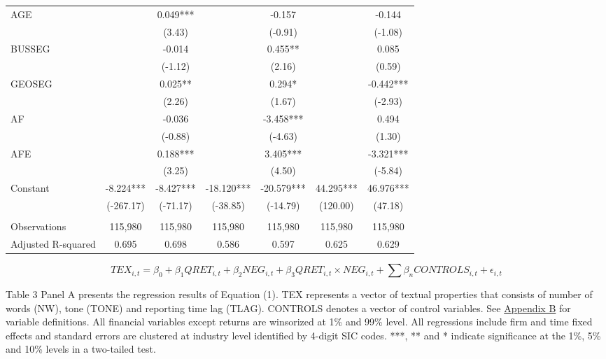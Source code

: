 \begin{table}[H]
\begin{center}
\begin{tabular}{lcccccc}
			AGE &   & 0.049*** &   & -0.157 &   & -0.144 \\
			&   & (3.43) &   & (-0.91) &   & (-1.08) \\
			BUSSEG &   & -0.014 &   & 0.455** &   & 0.085 \\
			&   & (-1.12) &   & (2.16) &   & (0.59) \\
			GEOSEG &   & 0.025** &   & 0.294* &   & -0.442*** \\
			&  & (2.26) &   & (1.67) &   & (-2.93) \\
			AF &   & -0.036 &   & -3.458*** &   & 0.494 \\
			&   & (-0.88) &   & (-4.63) &   & (1.30) \\
			AFE &   & 0.188*** &   & 3.405*** &   & -3.321*** \\
			&   & (3.25) &   & (4.50) &   & (-5.84) \\
			Constant & -8.224*** & -8.427*** & -18.120*** & -20.579*** & 44.295*** & 46.976*** \\
			& (-267.17) & (-71.17) & (-38.85) & (-14.79) & (120.00) & (47.18) \\
			&   &   &   &   &   &  \\
			Observations & 115,980 & 115,980 & 115,980 & 115,980 & 115,980 & 115,980 \\
			Adjusted R-squared & 0.695 & 0.698 & 0.586 & 0.597 & 0.625 & 0.629 \\
			\bottomrule
			\bottomrule
		\end{tabular}%
	\end{center}
		\begin{footnotesize}
			\setcounter{equation}{0}
			\begin{equation}
				TEX_{i,t}=\beta_0+\beta_1QRET_{i,t}+\beta_2NEG_{i,t}+\beta_3QRET_{i,t}\times NEG_{i,t}+\sum\beta_nCONTROLS_{i,t}+\epsilon_{i,t}
			\end{equation}
			
			\noindent Table 3 Panel A presents the regression results of Equation (1). TEX represents a vector of textual properties that consists of number of words (NW), tone (TONE) and reporting time lag (TLAG). CONTROLS denotes a vector of control variables. See \hyperref[appb]{Appendix B} for variable definitions. All financial variables except returns are winsorized at 1\% and 99\% level. All regressions include firm and time fixed effects and standard errors are clustered at industry level identified by 4-digit SIC codes. ***, ** and * indicate significance at the 1\%, 5\% and 10\% levels in a two-tailed test.
		\end{footnotesize}
\end{table}%